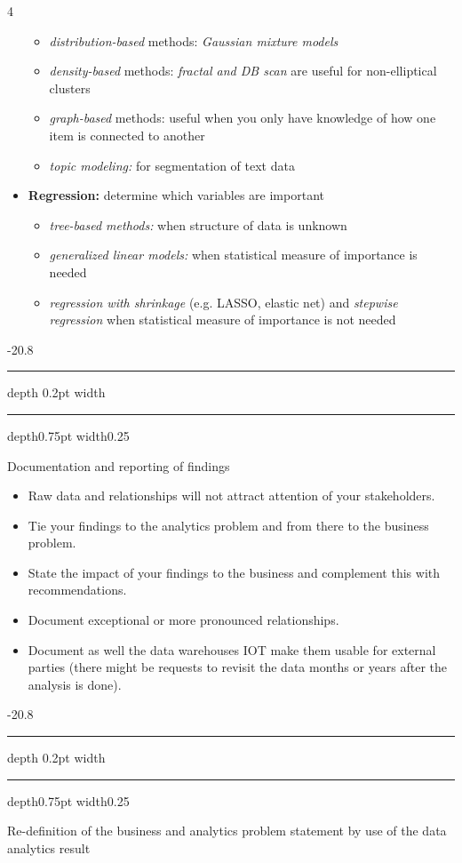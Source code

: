 \documentclass[a4paper, landscape, 6pt, fleqn]{scrartcl}
\makeatletter
\renewcommand{\emph}[1]{\textbf{#1}}
\renewcommand{\subsection}{\@startsection{subsection}{1}{0mm}%
{-2\baselineskip}{0.8\baselineskip}%
{\hrule depth 0.2pt width\columnwidth\hrule depth0.75pt
width0.25\columnwidth\vspace*{1.2em}\large\bfseries}}
\makeatother
\begin{document}
\begin{multicols*}{4}
\begin{itemize}
\begin{itemize}
\item \textit{distribution-based} methods: \textit{Gaussian mixture models}
\item \textit{density-based} methods: \textit{fractal and DB scan} are useful for non-elliptical clusters
\item \textit{graph-based} methods: useful when you only have knowledge of how one item is connected to another
\item \textit{topic modeling:} for segmentation of text data
\end{itemize}
\item \emph{Regression:} determine which variables are important
\begin{itemize}
\item \textit{tree-based methods:} when structure of data is unknown
\item \textit{generalized linear models:} when statistical measure of importance is needed
\item \textit{regression with shrinkage} (e.g. LASSO, elastic net) and \textit{stepwise regression} when statistical measure of importance is not needed
\end{itemize}
\end{itemize}

\subsection{Documentation and reporting of findings}

\begin{itemize}
\item Raw data and relationships will not attract attention of your stakeholders.
\item Tie your findings to the analytics problem and from there to the business problem.
\item State the impact of your findings to the business and complement this with recommendations.
\item Document exceptional or more pronounced relationships.
\item Document as well the data warehouses IOT make them usable for external parties (there might be requests to revisit the data months or years after the analysis is done).
\end{itemize}

\subsection{Re-definition of the business and analytics problem statement by use of the data analytics result}


\end{multicols*}
\end{document}

